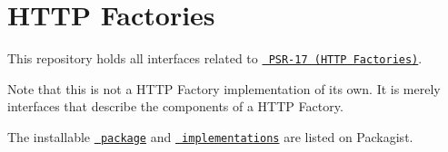 \chapter{HTTP Factories}
\hypertarget{md_vendor_2psr_2http-factory_2_r_e_a_d_m_e}{}\label{md_vendor_2psr_2http-factory_2_r_e_a_d_m_e}
This repository holds all interfaces related to \href{https://www.php-fig.org/psr/psr-17/}{\texttt{ PSR-\/17 (HTTP Factories)}}.

Note that this is not a HTTP Factory implementation of its own. It is merely interfaces that describe the components of a HTTP Factory.

The installable \href{https://packagist.org/packages/psr/http-factory}{\texttt{ package}} and \href{https://packagist.org/providers/psr/http-factory-implementation}{\texttt{ implementations}} are listed on Packagist. 